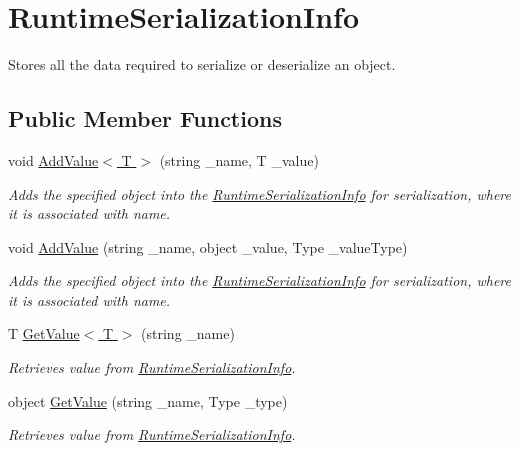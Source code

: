\hypertarget{class_voxel_busters_1_1_runtime_serialization_1_1_runtime_serialization_info}{}\section{Runtime\+Serialization\+Info}
\label{class_voxel_busters_1_1_runtime_serialization_1_1_runtime_serialization_info}


Stores all the data required to serialize or deserialize an object.  


\subsection*{Public Member Functions}
\begin{DoxyCompactItemize}
\item 
void \hyperlink{class_voxel_busters_1_1_runtime_serialization_1_1_runtime_serialization_info_ac0ca49c051194ccb86acf86a757a9fed}{Add\+Value$<$ T $>$} (string \+\_\+name, T \+\_\+value)
\begin{DoxyCompactList}\small\item\em Adds the specified object into the \hyperlink{class_voxel_busters_1_1_runtime_serialization_1_1_runtime_serialization_info}{Runtime\+Serialization\+Info} for serialization, where it is associated with name. \end{DoxyCompactList}\item 
void \hyperlink{class_voxel_busters_1_1_runtime_serialization_1_1_runtime_serialization_info_a2c98842a732a81c60f927c1c93664dac}{Add\+Value} (string \+\_\+name, object \+\_\+value, Type \+\_\+value\+Type)
\begin{DoxyCompactList}\small\item\em Adds the specified object into the \hyperlink{class_voxel_busters_1_1_runtime_serialization_1_1_runtime_serialization_info}{Runtime\+Serialization\+Info} for serialization, where it is associated with name. \end{DoxyCompactList}\item 
T \hyperlink{class_voxel_busters_1_1_runtime_serialization_1_1_runtime_serialization_info_a197deebcf58f289b38878942ec3f980c}{Get\+Value$<$ T $>$} (string \+\_\+name)
\begin{DoxyCompactList}\small\item\em Retrieves value from \hyperlink{class_voxel_busters_1_1_runtime_serialization_1_1_runtime_serialization_info}{Runtime\+Serialization\+Info}. \end{DoxyCompactList}\item 
object \hyperlink{class_voxel_busters_1_1_runtime_serialization_1_1_runtime_serialization_info_a4ed12be7f59087807778a09c29468439}{Get\+Value} (string \+\_\+name, Type \+\_\+type)
\begin{DoxyCompactList}\small\item\em Retrieves value from \hyperlink{class_voxel_busters_1_1_runtime_serialization_1_1_runtime_serialization_info}{Runtime\+Serialization\+Info}. \end{DoxyCompactList}\end{DoxyCompactItemize}


